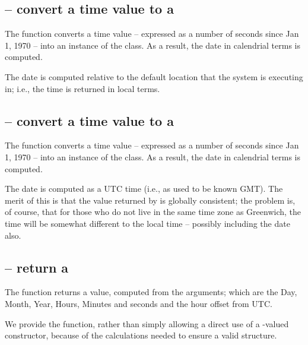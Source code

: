 \subsection{ -- convert a time value to a }
\label{time2date}


The  function converts a time value -- expressed as a number of seconds since Jan 1, 1970 -- into an instance of the  class. As a result, the date in calendrial terms is computed.

The date is computed relative to the default location that the \go system is executing in; i.e., the time is returned in local terms.

\subsection{ -- convert a time value to a }
\label{time2utc}


The  function converts a time value -- expressed as a number of seconds since Jan 1, 1970 -- into an instance of the  class. As a result, the date in calendrial terms is computed.

The date is computed as a UTC time (i.e., as used to be known GMT). The merit of this is that the value returned by  is globally consistent; the problem is, of course, that for those who do not live in the same time zone as Greenwich, the time will be somewhat different to the local time -- possibly including the date also.

\subsection{ -- return a }
\label{date:dateOf}


The  function returns a  value, computed from the arguments; which are the Day, Month, Year, Hours, Minutes and seconds and the hour offset from UTC.

\begin{aside}
We provide the  function, rather than simply allowing a direct use of a -valued constructor, because of the calculations needed to ensure a valid  structure.
\end{aside}


